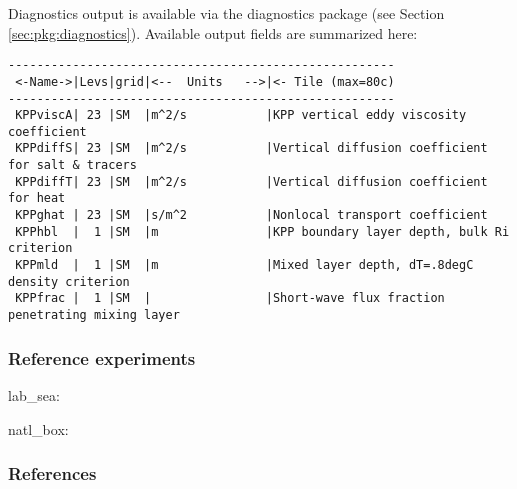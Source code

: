 Diagnostics output is available via the diagnostics package
(see Section \ref{sec:pkg:diagnostics}).
Available output fields are summarized here:

\begin{verbatim}
------------------------------------------------------
 <-Name->|Levs|grid|<--  Units   -->|<- Tile (max=80c)
------------------------------------------------------
 KPPviscA| 23 |SM  |m^2/s           |KPP vertical eddy viscosity coefficient
 KPPdiffS| 23 |SM  |m^2/s           |Vertical diffusion coefficient for salt & tracers
 KPPdiffT| 23 |SM  |m^2/s           |Vertical diffusion coefficient for heat
 KPPghat | 23 |SM  |s/m^2           |Nonlocal transport coefficient
 KPPhbl  |  1 |SM  |m               |KPP boundary layer depth, bulk Ri criterion
 KPPmld  |  1 |SM  |m               |Mixed layer depth, dT=.8degC density criterion
 KPPfrac |  1 |SM  |                |Short-wave flux fraction penetrating mixing layer
\end{verbatim}


\subsubsection{Reference experiments}

lab\_sea:

natl\_box:


\subsubsection{References}

